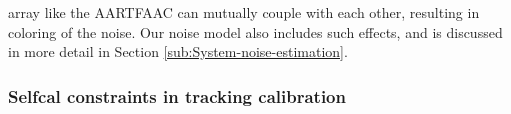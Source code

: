 \documentclass{aa}
\begin{document}
array  like the  AARTFAAC  can mutually  couple  with each  other, resulting  in
coloring  of the  noise. Our  noise  model also  includes such  effects, and  is
discussed in more detail in Section \ref{sub:System-noise-estimation}.

\begin{table}[tbh]
\caption{\label{tab:Details-of-model}Details of  model sources used  for All-sky
 Selfcal.   The $S_{60}$  has  been  generated using  the  spectral indices  of
 \citep{helmboldt2008radio}, while  a secular decrease  in the flux of  CasA of
  -0.8\% has been assumed. }
\end{table}

\subsubsection{Selfcal constraints in tracking calibration}
\end{document}
